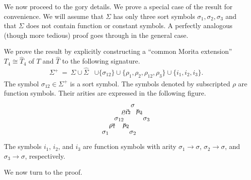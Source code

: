 We now proceed to the gory details.  We prove a
special case of the result for convenience. We will assume that
$\Sigma$ has only three sort symbols $\sigma_1, \sigma_2,\sigma_3$ and
that $\Sigma$ does not contain function or constant symbols. A
perfectly analogous (though more tedious) proof goes through in the
general case.

We prove the result by explicitly constructing a ``common Morita extension'' $T_{4}\cong \widehat{T}_{4}$ of $T$ and $\widehat{T}$ to the following signature.
\begin{align*}
\Sigma^+\:=\:\Sigma\cup\widehat{\Sigma}&\cup\{\sigma_{12}\} \cup \{\rho_1, \rho_2, \rho_{12}, \rho_3\}
\cup\{ i_1,i_2, i_3\} .
\end{align*}
The symbol $\sigma_{12}\in\Sigma^+$ is a sort symbol. The symbols
denoted by subscripted $\rho$ are function symbols. Their arities are
expressed in the following figure.
\[
\begin{tikzpicture}
\node(5) {$\sigma$};
\node(6) [below right of=5] {$\sigma_{3}$};
\node(7) [below left of=5] {$\sigma_{12}$};
\node(8) [below right of=7] {$\sigma_2$};
\node(9) [below left of =7] {$\sigma_1$};
\draw[->] (9) to node {$\rho_1$} (7);
\draw[->] (7) to node {$\rho_{12}$} (5);
\draw[->] (6) to node {$\rho_{3}$} (5);
\draw[->] (8) to node {$\rho_2$} (7);
\end{tikzpicture}
\]
The symbols $i_1$, $i_2$, and $i_3$ are function symbols with arity $\sigma_1\rightarrow \sigma$, $\sigma_2\rightarrow\sigma$, and $\sigma_3\rightarrow\sigma$, respectively.

We now turn to the proof.

